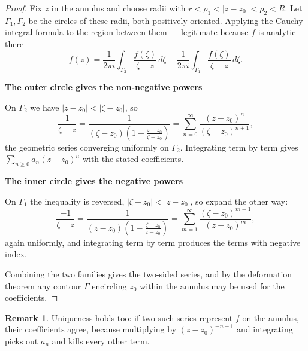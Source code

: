 \documentclass[11pt,a4paper]{article}
\theoremstyle{definition}
\newtheorem{remark}[thm]{Remark}
\newcommand{\subhead}[1]{%
  \par\medskip\noindent\textbf{#1}\par\nobreak\smallskip}
\begin{document}
\begin{proof}
Fix $z$ in the annulus and choose radii with
$r<\rho_1<\left|z-z_0\right|<\rho_2<R$. Let $\Gamma_1,\Gamma_2$ be the circles
of these radii, both positively oriented. Applying the Cauchy integral formula
to the region between them --- legitimate because $f$ is analytic there ---
$$f(z)=\frac{1}{2\pi i}\int_{\Gamma_2}\frac{f(\zeta)}{\zeta-z}\,d\zeta
-\frac{1}{2\pi i}\int_{\Gamma_1}\frac{f(\zeta)}{\zeta-z}\,d\zeta .$$

\subhead{The outer circle gives the non-negative powers}
On $\Gamma_2$ we have $\left|z-z_0\right|<\left|\zeta-z_0\right|$, so
$$\frac{1}{\zeta-z}=\frac{1}{(\zeta-z_0)\left(1-\frac{z-z_0}{\zeta-z_0}\right)}
=\sum_{n=0}^{\infty}\frac{(z-z_0)^n}{(\zeta-z_0)^{n+1}} ,$$
the geometric series converging uniformly on $\Gamma_2$. Integrating term by
term gives $\sum_{n\geq 0}a_n(z-z_0)^n$ with the stated coefficients.

\subhead{The inner circle gives the negative powers}
On $\Gamma_1$ the inequality is reversed, $\left|\zeta-z_0\right|<\left|z-z_0\right|$,
so expand the other way:
$$\frac{-1}{\zeta-z}=\frac{1}{(z-z_0)\left(1-\frac{\zeta-z_0}{z-z_0}\right)}
=\sum_{m=1}^{\infty}\frac{(\zeta-z_0)^{m-1}}{(z-z_0)^{m}} ,$$
again uniformly, and integrating term by term produces the terms with negative
index.

Combining the two families gives the two-sided series, and by the deformation
theorem any contour $\Gamma$ encircling $z_0$ within the annulus may be used
for the coefficients.
\end{proof}

\begin{remark}
Uniqueness holds too: if two such series represent $f$ on the annulus, their
coefficients agree, because multiplying by $(z-z_0)^{-n-1}$ and integrating
picks out $a_n$ and kills every other term.
\end{remark}
\end{document}
